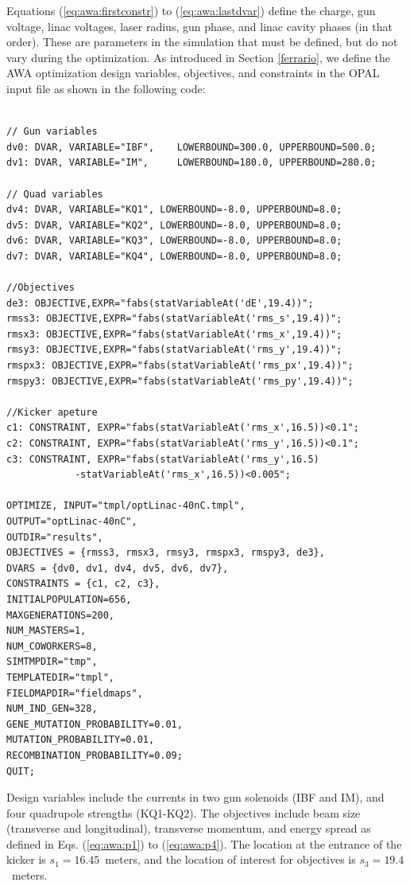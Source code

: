 Equations (\ref{eq:awa:firstconstr}) to
(\ref{eq:awa:lastdvar}) define the charge, gun voltage, linac voltages, 
laser radius, gun phase, and linac cavity phases (in that order). 
These are parameters in the simulation 
that must be defined, but do not vary during the optimization.
As introduced in Section \ref{ferrario}, we define the AWA optimization 
design variables, objectives, and constraints in the OPAL input file as shown in
the following code: %
\begin{Verbatim}[fontsize=\scriptsize]

// Gun variables 
dv0: DVAR, VARIABLE="IBF",    LOWERBOUND=300.0, UPPERBOUND=500.0;
dv1: DVAR, VARIABLE="IM",     LOWERBOUND=180.0, UPPERBOUND=280.0;

// Quad variables 
dv4: DVAR, VARIABLE="KQ1", LOWERBOUND=-8.0, UPPERBOUND=8.0;
dv5: DVAR, VARIABLE="KQ2", LOWERBOUND=-8.0, UPPERBOUND=8.0;
dv6: DVAR, VARIABLE="KQ3", LOWERBOUND=-8.0, UPPERBOUND=8.0;
dv7: DVAR, VARIABLE="KQ4", LOWERBOUND=-8.0, UPPERBOUND=8.0;

//Objectives
de3: OBJECTIVE,EXPR="fabs(statVariableAt('dE',19.4))";
rmss3: OBJECTIVE,EXPR="fabs(statVariableAt('rms_s',19.4))";
rmsx3: OBJECTIVE,EXPR="fabs(statVariableAt('rms_x',19.4))";
rmsy3: OBJECTIVE,EXPR="fabs(statVariableAt('rms_y',19.4))";
rmspx3: OBJECTIVE,EXPR="fabs(statVariableAt('rms_px',19.4))";
rmspy3: OBJECTIVE,EXPR="fabs(statVariableAt('rms_py',19.4))";

//Kicker apeture
c1: CONSTRAINT, EXPR="fabs(statVariableAt('rms_x',16.5))<0.1";
c2: CONSTRAINT, EXPR="fabs(statVariableAt('rms_y',16.5))<0.1";
c3: CONSTRAINT, EXPR="fabs(statVariableAt('rms_y',16.5)
			-statVariableAt('rms_x',16.5))<0.005";

OPTIMIZE, INPUT="tmpl/optLinac-40nC.tmpl",
OUTPUT="optLinac-40nC",
OUTDIR="results",
OBJECTIVES = {rmss3, rmsx3, rmsy3, rmspx3, rmspy3, de3},
DVARS = {dv0, dv1, dv4, dv5, dv6, dv7},
CONSTRAINTS = {c1, c2, c3},
INITIALPOPULATION=656,
MAXGENERATIONS=200,
NUM_MASTERS=1,
NUM_COWORKERS=8,
SIMTMPDIR="tmp",
TEMPLATEDIR="tmpl",
FIELDMAPDIR="fieldmaps",
NUM_IND_GEN=328,
GENE_MUTATION_PROBABILITY=0.01,
MUTATION_PROBABILITY=0.01,
RECOMBINATION_PROBABILITY=0.09;
QUIT;
\end{Verbatim}
\vspace{0.2cm}

Design variables include the currents in two gun solenoids (IBF and IM), 
and four quadrupole strengths (KQ1-KQ2). The objectives include
beam size (transverse and longitudinal), transverse momentum, and energy spread as
defined in Eqs. (\ref{eq:awa:p1}) to (\ref{eq:awa:p4}). 
The location at the entrance of the kicker is $s_1=16.45$~meters, 
and the location of interest for objectives is $s_3=19.4$~meters. 



